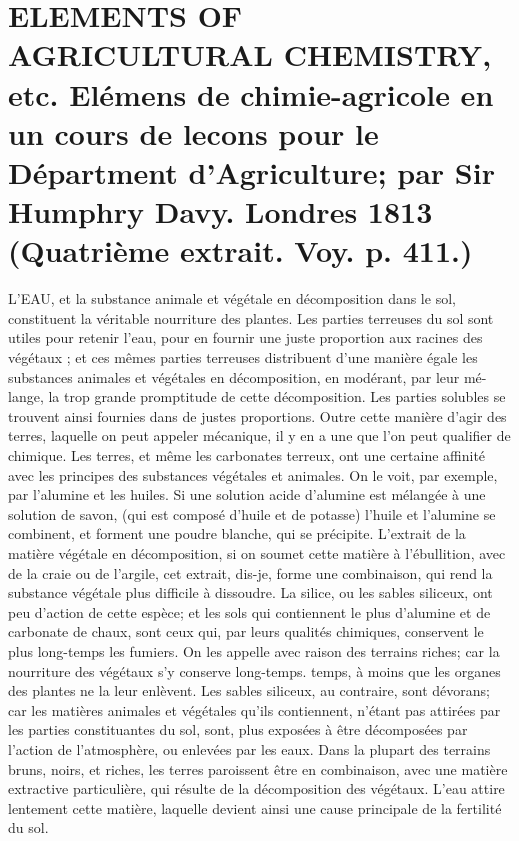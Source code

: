 \setcounter{page}{462}
\section{ELEMENTS OF AGRICULTURAL CHEMISTRY, etc. Elémens de chimie-agricole en un cours de lecons pour le Départment d'Agriculture; par Sir Humphry Davy. Londres 1813 \large{(Quatrième extrait. Voy. p. 411.)}}
L'EAU, et la substance animale et végétale en décomposition dans le sol, constituent la véritable nourriture des plantes. Les parties terreuses du sol sont utiles pour retenir l'eau, pour en fournir une juste proportion aux racines des végétaux ; et ces mêmes parties terreuses distribuent d'une manière égale les substances animales et végétales en décomposition, en modérant, par leur mé-\setcounter{page}{463} lange, la trop grande promptitude de cette décomposition. Les parties solubles se trouvent ainsi fournies dans de justes proportions. Outre cette manière d'agir des terres, laquelle on peut appeler mécanique, il y en a une que l'on peut qualifier de chimique. Les terres, et même les carbonates terreux, ont une certaine affinité avec les principes des substances végétales et animales. On le voit, par exemple, par l'alumine et les huiles. Si une solution acide d'alumine est mélangée à une solution de savon, (qui est composé d'huile et de potasse) l'huile et l'alumine se combinent, et forment une poudre blanche, qui se précipite. L'extrait de la matière végétale en décomposition, si on soumet cette matière à l'ébullition, avec de la craie ou de l'argile, cet extrait, dis-je, forme une combinaison, qui rend la substance végétale plus difficile à dissoudre. La silice, ou les sables siliceux, ont peu d'action de cette espèce; et les sols qui contiennent le plus d'alumine et de carbonate de chaux, sont ceux qui, par leurs qualités chimiques, conservent le plus long-temps les fumiers. On les appelle avec raison des terrains riches; car la nourriture des végétaux s'y conserve long-temps.\setcounter{page}{464} temps, à moins que les organes des plantes ne la leur enlèvent. Les sables siliceux, au contraire, sont dévorans; car les matières animales et végétales qu'ils contiennent, n'étant pas attirées par les parties constituantes du sol, sont, plus exposées à être décomposées par l'action de l'atmosphère, ou enlevées par les eaux.
Dans la plupart des terrains bruns, noirs, et riches, les terres paroissent être en combinaison, avec une matière extractive particulière, qui résulte de la décomposition des végétaux. L'eau attire lentement cette matière, laquelle devient ainsi une cause principale de la fertilité du sol.
